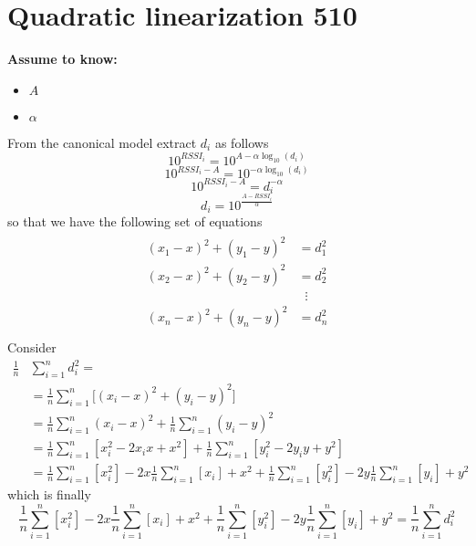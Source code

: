 \documentclass[12pt,twoside]{report}
\begin{document}
\section{Quadratic linearization 510}
  \begin{center}
  \textbf{Assume to know:}
  \begin{itemize}
    \centering
    \item $A$
    \item $\alpha$
  \end{itemize}
  \end{center}
From the canonical model extract $d_i$ as follows
\begin{equation*}
    10^{RSSI_{i}}=10^{A-\alpha\log_{10}(d_i)}
\end{equation*}
\begin{equation*}
    10^{RSSI_{i}-A}=10^{-\alpha\log_{10}(d_i)}
\end{equation*}
\begin{equation*}
     10^{RSSI_{i}-A}=d_i^{-\alpha}
\end{equation*}
\begin{equation}
    d_i=10^{\frac{A-RSSI_{i}}{\alpha}}
\end{equation}
so that we have the following set of equations
\begin{align}
\begin{split} 
(x_1-x)^2+(y_1-y)^2&=d_1^2 \\ 
(x_2-x)^2+(y_2-y)^2&=d_2^2 \\ 
&\;\;\vdots\\
(x_n-x)^2+(y_n-y)^2&=d_n^2 \\
\end{split}
\label{eq:11}
\end{align}
Consider 
\begin{align}
\frac{1}{n}&\sum_{i=1}^nd_i^2=\\
&=\frac{1}{n}\sum_{i=1}^n\big[(x_i-x)^2+(y_i-y)^2\big]\\
&=\frac{1}{n}\sum_{i=1}^n(x_i-x)^2+\frac{1}{n}\sum_{i=1}^n(y_i-y)^2\\
&=\frac{1}{n}\sum_{i=1}^n[x_i^2-2x_ix+x^2] + \frac{1}{n}\sum_{i=1}^n[y_i^2-2y_iy+y^2]\\
&=\frac{1}{n}\sum_{i=1}^n[x_i^2]-2x\frac{1}{n}\sum_{i=1}^n[x_i]+ x^2 + \frac{1}{n}\sum_{i=1}^n[y_i^2]-2y\frac{1}{n}\sum_{i=1}^n[y_i]+ y^2
\end{align}
which is finally
\begin{equation}
    \frac{1}{n}\sum_{i=1}^n[x_i^2]-2x\frac{1}{n}\sum_{i=1}^n[x_i]+ x^2 + \frac{1}{n}\sum_{i=1}^n[y_i^2]-2y\frac{1}{n}\sum_{i=1}^n[y_i]+ y^2= \frac{1}{n}\sum_{i=1}^nd_i^2
    \label{eq:12}
\end{equation}
\end{document}
